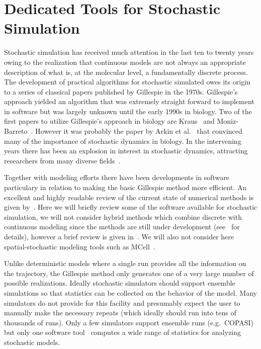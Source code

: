\documentclass[12pt]{article}
\begin{document}
\section{Dedicated Tools for Stochastic Simulation}

Stochastic simulation has received much attention in the last ten to
twenty years owing to the realization that continuous models are not
always an appropriate description of what is, at the molecular
level, a fundamentally discrete process. The development of
practical algorithms for stochastic simulated owes its origin to a
series of classical papers published by Gillespie in the 1970s.
Gillespie's approach yielded an algorithm that was extremely
straight forward to implement in software but was largely unknown
until the early 1990s in biology. Two of the first papers to utilize
Gillespie's approach in biology are Kraus~\citep{Kraus:1992} and
Moniz-Barreto~\citep{MonizBarreto:1993}. However it was probably the
paper by Arkin et al.~\citep{ArkinLambda1998} that convinced many of
the importance of stochastic dynamics in biology. In the intervening
years there has been an explosion in interest in stochastic
dynamics, attracting researchers from many diverse
fields~\citep{PiCalc:2003,Wilkinson:Book,Ullah:2007}.

Together with modeling efforts there have been developments in software particulary
in relation to making the basic Gillespie method more efficient. An
excellent and highly readable review of the current state of
numerical methods is given by~\citep{Gillespie:2007}. Here we will
briefly review some of the software available for stochastic
simulation, we will not consider hybrid methods which combine
discrete with continuous modeling since the methods are still
under development (see~\citep{Salis:2006} for details), however a
brief review is given in~\citep{Ullah:2007}. We will also not
consider here spatial-stochastic modeling tools such as
MCell~\citep{MCell:2001}.

Unlike deterministic models where a single run provides all the
information on the trajectory, the Gillespie method only generates
one of a very large number of possible realizations. Ideally
stochastic simulators should support ensemble simulations so that
statistics can be collected on the behavior of the model. Many
simulators do not provide for this facility and presumably expect
the user to manually make the necessary repeats (which ideally
should run into tens of thousands of runs). Only a few simulators
support ensemble runs (e.g.\ COPASI) but only one software
tool~\citep
{RoaSauro:2007} computes a wide range of statistics for
analyzing stochastic models.
\end{document}
